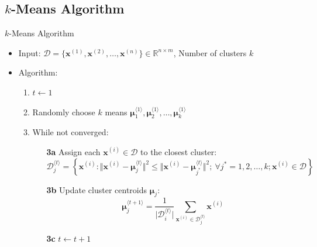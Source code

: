\subsection{$k$-Means Algorithm}

\begin{frame}{$k$-Means Algorithm}{}
	\begin{itemize}
		\item Input: $\mathcal{D} = \{ \bm{x}^{(1)}, \bm{x}^{(2)}, \dots, \bm{x}^{(n)} \} \in \mathbb{R}^{n \times m}$,
			Number of clusters $k$	
		\item Algorithm:
		\begin{enumerate}
			\item $t \longleftarrow 1$
			\item Randomly choose $k$ means $\bm{\mu}_1^{\langle 1 \rangle}, \bm{\mu}_2^{\langle 1 \rangle}, \dots, \bm{\mu}_k^{\langle 1 \rangle}$ 
			\item While not converged:
			\begin{itemize}
				\item[\textbf{3a}] Assign each $\bm{x}^{(i)} \in \mathcal{D}$ to the closest cluster:
				{\footnotesize
				\begin{equation*}
					\mathcal{D}_j^{\langle t \rangle}
						= \left\{
							\bm{x}^{(i)} : \Vert \bm{x}^{(i)} - \bm{\mu}_j^{\langle t \rangle} \Vert^2 \le
							\Vert \bm{x}^{(i)} - \bm{\mu}_{j^*}^{\langle t \rangle} \Vert^2;\
							\forall j^* = 1, 2, \dots, k; \bm{x}^{(i)} \in \mathcal{D}
						\right\}
				\end{equation*}}
				\item[\textbf{3b}] Update cluster centroids $\bm{\mu}_j$:
				{\footnotesize
				\begin{equation*}
					\bm{\mu}_{j}^{\langle t+1 \rangle} =
						\frac{1}{\vert \mathcal{D}_i^{\langle t \rangle} \vert} \sum_{\bm{x}^{(i)} \in \mathcal{D}_j^{\langle t \rangle}} \bm{x}^{(i)}
				\end{equation*}}
				\item[\textbf{3c}] $t \longleftarrow t + 1$
			\end{itemize}
		\end{enumerate}
	\end{itemize}
\end{frame}


